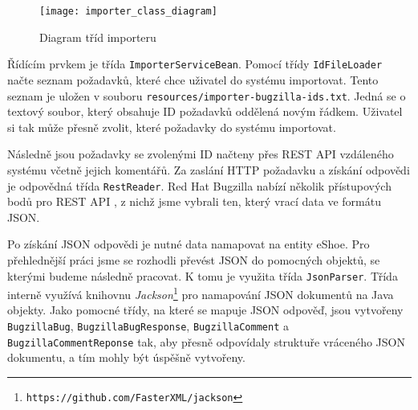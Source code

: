 \documentclass[11pt,oneside]{fithesis2}
\begin{document}
\begin{figure}[htb]
	\begin{center}
		\texttt{[image: importer\_class\_diagram]}
	\end{center}
	\caption{Diagram tříd importeru}	
	\label{ImporterClassDiagram}
\end{figure}

Řídícím prvkem je třída \texttt{ImporterServiceBean}. Pomocí třídy \texttt{IdFileLoader} načte seznam požadavků, které chce uživatel do systému importovat. Tento seznam je uložen v souboru \texttt{resources/importer-bugzilla-ids.txt}. Jedná se o textový soubor, který obsahuje ID požadavků oddělená novým řádkem. Uživatel si tak může přesně zvolit, které požadavky do systému importovat. 

Následně jsou požadavky se zvolenými ID načteny přes REST API vzdáleného systému včetně jejich komentářů. Za zaslání HTTP požadavku a získání odpovědi je odpovědná třída \texttt{RestReader}. Red Hat Bugzilla nabízí několik přístupových bodů pro REST API \cite{Bugzilla}, z nichž jsme vybrali ten, který vrací data ve formátu JSON.

Po získání JSON odpovědi je nutné data namapovat na entity eShoe. Pro přehlednější práci jsme se rozhodli převést JSON do pomocných objektů, se kterými budeme následně pracovat. K tomu je využita třída \texttt{JsonParser}. Třída interně využívá knihovnu \emph{Jackson}\footnote{\texttt{https://github.com/FasterXML/jackson}} pro namapování JSON dokumentů na Java objekty. Jako pomocné třídy, na které se mapuje JSON odpověď, jsou vytvořeny \texttt{BugzillaBug}, \texttt{BugzillaBugResponse}, \texttt{BugzillaComment} a \texttt{BugzillaCommentReponse} tak, aby přesně odpovídaly struktuře vráceného JSON dokumentu, a tím mohly být úspěšně vytvořeny.
\end{document}
